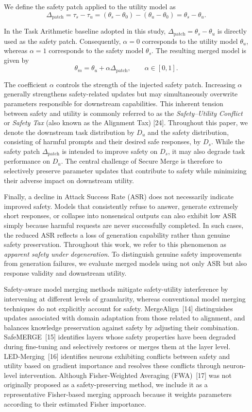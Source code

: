 We define the safety patch applied to the utility model as
\[
\Delta_{\mathrm{patch}}
=
\tau_s-\tau_u
=
(\theta_s-\theta_0)-(\theta_u-\theta_0)
=
\theta_s-\theta_u.
\]

In the Task Arithmetic baseline adopted in this study, $\Delta_{\mathrm{patch}}=\theta_s-\theta_u$ is directly used as the safety patch. Consequently, $\alpha=0$ corresponds to the utility model $\theta_u$, whereas $\alpha=1$ corresponds to the safety model $\theta_s$. The resulting merged model is given by
\[
\theta_m
=
\theta_u+\alpha\Delta_{\mathrm{patch}},
\qquad
\alpha\in[0,1].
\]

The coefficient $\alpha$ controls the strength of the injected safety patch. Increasing $\alpha$ generally strengthens safety-related updates but may simultaneously overwrite parameters responsible for downstream capabilities. This inherent tension between safety and utility is commonly referred to as the \emph{Safety--Utility Conflict} or \emph{Safety Tax} (also known as the Alignment Tax) [24]. Throughout this paper, we denote the downstream task distribution by $D_u$ and the safety distribution, consisting of harmful prompts and their desired safe responses, by $D_s$. While the safety patch $\Delta_{\mathrm{patch}}$ is intended to improve safety on $D_s$, it may also degrade task performance on $D_u$. The central challenge of Secure Merge is therefore to selectively preserve parameter updates that contribute to safety while minimizing their adverse impact on downstream utility.


Finally, a decline in Attack Success Rate (ASR) does not necessarily indicate improved safety. Models that consistently refuse to answer, generate extremely short responses, or collapse into nonsensical outputs can also exhibit low ASR simply because harmful requests are never successfully completed. In such cases, the reduced ASR reflects a loss of generation capability rather than genuine safety preservation. Throughout this work, we refer to this phenomenon as \emph{apparent safety under degeneration}. To distinguish genuine safety improvements from generation failures, we evaluate merged models using not only ASR but also response validity and downstream utility.




Safety-aware model merging methods mitigate safety-utility interference by intervening at different levels of granularity, whereas conventional model merging techniques do not explicitly account for safety. MergeAlign~[14] distinguishes updates associated with domain adaptation from those related to alignment, and balances knowledge preservation against safety by adjusting their combination. SafeMERGE~[15] identifies layers whose safety properties have been degraded during fine-tuning and selectively restores or merges them at the layer level. LED-Merging~[16] identifies neurons exhibiting conflicts between safety and utility based on gradient importance and resolves these conflicts through neuron-level intervention. Although Fisher-Weighted Averaging (FWA)~[17] was not originally proposed as a safety-preserving method, we include it as a representative Fisher-based merging approach because it weights parameters according to their estimated Fisher importance.


